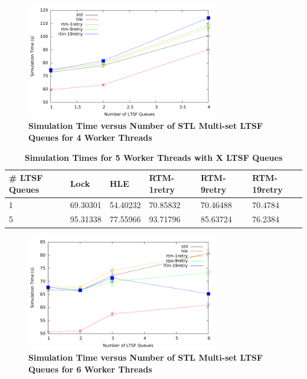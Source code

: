 \documentclass[11pt]{book}
\begin{document}
\begin{figure}[H]
    \centering
    \graphicspath{ {./figures/} }
    \includegraphics[width=0.75\textwidth,keepaspectratio]{hugeepidemicsim-XEVENTmig-timeVSschedQs-multiset-4thread}
    \caption{\textbf{Simulation Time versus Number of STL Multi-set LTSF Queues for 4
        Worker Threads}}\label{fig:xThrMig_timeVSschq_4threads}
\end{figure}

\begin{table}[H]
    \centering
    \begin{tabular}{l|p{2cm}|p{2cm}|p{2cm}|p{2cm}|p{2cm}}
        \textbf{\# LTSF Queues}&Lock &HLE &RTM-1retry &RTM-9retry &RTM-19retry \\
        \hline
        \midrule
            1 &69.30301  &54.40232 &70.85832  &70.46488 &70.4784 \\ 
            5 &95.31338  &77.55966 &93.71796  &85.63724 &76.2384 \\
    \end{tabular}
    \caption{\textbf{Simulation Times for 5 Worker Threads with X LTSF
        Queues}}\label{tab:xThrMig_5threadsXschq}
\end{table}

\begin{figure}[H]
    \centering
    \graphicspath{ {./figures/} }
    \includegraphics[width=0.75\textwidth,keepaspectratio]{hugeepidemicsim-XEVENTmig-timeVSschedQs-multiset-6thread}
    \caption{\textbf{Simulation Time versus Number of STL Multi-set LTSF Queues for 6
        Worker Threads}}\label{fig:xThrMig_timeVSschq_6threads}
\end{figure}
\end{document}
